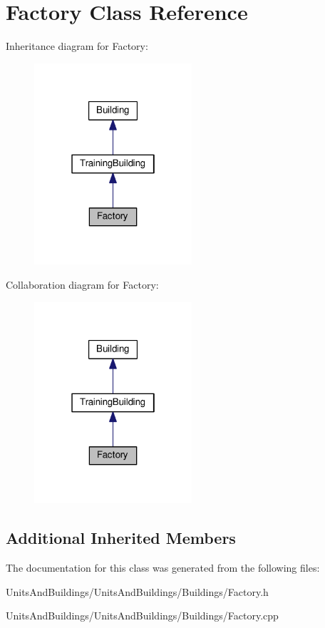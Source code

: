 \hypertarget{class_factory}{}\section{Factory Class Reference}
\label{class_factory}


Inheritance diagram for Factory\+:
\nopagebreak
\begin{figure}[H]
\begin{center}
\leavevmode
\includegraphics[width=166pt]{class_factory__inherit__graph}
\end{center}
\end{figure}


Collaboration diagram for Factory\+:
\nopagebreak
\begin{figure}[H]
\begin{center}
\leavevmode
\includegraphics[width=166pt]{class_factory__coll__graph}
\end{center}
\end{figure}
\subsection*{Additional Inherited Members}


The documentation for this class was generated from the following files\+:\begin{DoxyCompactItemize}
\item 
Units\+And\+Buildings/\+Units\+And\+Buildings/\+Buildings/Factory.\+h\item 
Units\+And\+Buildings/\+Units\+And\+Buildings/\+Buildings/Factory.\+cpp\end{DoxyCompactItemize}
